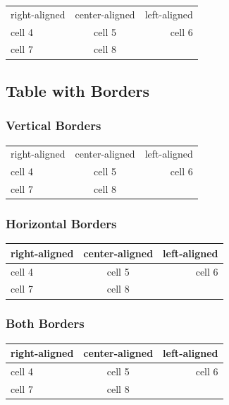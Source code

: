 		\begin{center}
			\begin{tabular}{l c r}
				right-aligned 	& center-aligned 	& left-aligned \\
				cell 4 			& cell 5 			& cell 6 	   \\
				cell 7 			& cell 8
			\end{tabular}
		\end{center}
	
	\subsection{Table with Borders}
	
		\subsubsection*{Vertical Borders}
		
			\begin{center}
				\begin{tabular}{|l|c|r|}
					right-aligned 	& center-aligned 	& left-aligned \\
					cell 4 			& cell 5 			& cell 6 	   \\
					cell 7 			& cell 8 			&\\
				\end{tabular}
			\end{center}
		
		\subsubsection*{Horizontal Borders}
		
			\begin{center}
				\begin{tabular}{l c r}
					\hline
					right-aligned 	& center-aligned 	& left-aligned \\
					\hline
					cell 4 			& cell 5 			& cell 6 	   \\
					cell 7 			& cell 8 			&\\
					\hline
				\end{tabular}
			\end{center}
		
		\subsubsection*{Both Borders}
		
			\begin{center}
				\begin{tabular}{|l|c|r|}
					\hline
					right-aligned 	& center-aligned 	& left-aligned \\
					\hline
					cell 4 			& cell 5 			& cell 6 	   \\
					\hline
					cell 7 			& cell 8 			&\\
					\hline
				\end{tabular}
			\end{center}
		

